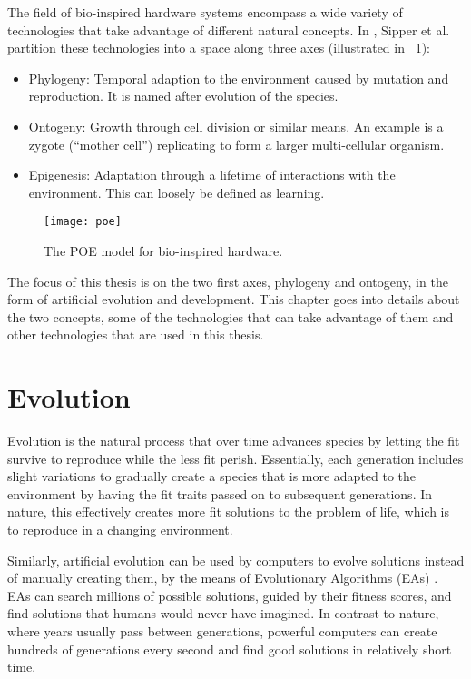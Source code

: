 The field of bio-inspired hardware systems encompass a wide variety of technologies that take advantage of different natural concepts.
In \cite{sipper1997poe}, Sipper et al. partition these technologies into a space along three axes (illustrated in \figurename~\ref{fig:poe}):

\begin{itemize}
    \item
    Phylogeny:
    Temporal adaption to the environment caused by mutation and reproduction.
    It is named after evolution of the species.
    \item
    Ontogeny:
    Growth through cell division or similar means.
    An example is a zygote (``mother cell'') replicating to form a larger multi-cellular organism.
    \item
    Epigenesis:
    Adaptation through a lifetime of interactions with the environment.
    This can loosely be defined as learning.
\end{itemize}

\begin{figure}[!ht]
    \centering
    \texttt{[image: poe]}
    \caption[POE model]{
        The POE model for bio-inspired hardware.
    }
    \label{fig:poe}
\end{figure}

The focus of this thesis is on the two first axes, phylogeny and ontogeny, in the form of artificial evolution and development.
This chapter goes into details about the two concepts, some of the technologies that can take advantage of them and other technologies that are used in this thesis.


\section{Evolution}

Evolution is the natural process that over time advances species by letting the fit survive to reproduce while the less fit perish.
Essentially, each generation includes slight variations to gradually create a species that is more adapted to the environment by having the fit traits passed on to subsequent generations.
In nature, this effectively creates more fit solutions to the problem of life, which is to reproduce in a changing environment.

Similarly, artificial evolution can be used by computers to evolve solutions instead of manually creating them, by the means of Evolutionary Algorithms (EAs) \cite{holland1992adaptation}.
EAs can search millions of possible solutions, guided by their fitness scores, and find solutions that humans would never have imagined.
In contrast to nature, where years usually pass between generations, powerful computers can create hundreds of generations every second and find good solutions in relatively short time.

